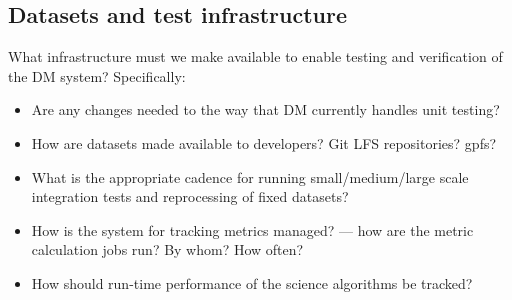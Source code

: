 \subsection{Datasets and test infrastructure}
\label{sec:approach:test}

What infrastructure must we make available to enable testing and verification
of the DM system? Specifically:

\begin{itemize}

  \item{Are any changes needed to the way that DM currently handles unit testing?}
  \item{How are datasets made available to developers? Git LFS repositories?  \gls{gpfs}?}
  \item{What is the appropriate cadence for running small/medium/large scale integration tests and reprocessing of fixed datasets?}
  \item{How is the system for tracking \glspl{metric} managed? --- how are the metric calculation jobs run? By whom? How often?}
  \item{How should run-time performance of the science algorithms be tracked?}

\end{itemize}
